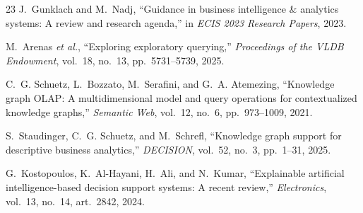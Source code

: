 \documentclass[journal]{IEEEtran}
\begin{document}
\begin{thebibliography}{23}
J.~Gunklach and M.~Nadj, ``Guidance in business intelligence \& analytics systems: A review and research agenda,'' in \emph{ECIS 2023 Research Papers}, 2023.

M.~Arenas \emph{et al.}, ``Exploring exploratory querying,'' \emph{Proceedings of the VLDB Endowment}, vol.~18, no.~13, pp.~5731--5739, 2025.

C.~G. Schuetz, L.~Bozzato, M.~Serafini, and G.~A. Atemezing, ``Knowledge graph OLAP: A multidimensional model and query operations for contextualized knowledge graphs,'' \emph{Semantic Web}, vol.~12, no.~6, pp.~973--1009, 2021.

S.~Staudinger, C.~G. Schuetz, and M.~Schrefl, ``Knowledge graph support for descriptive business analytics,'' \emph{DECISION}, vol.~52, no.~3, pp.~1--31, 2025.

G.~Kostopoulos, K.~Al-Hayani, H.~Ali, and N.~Kumar, ``Explainable artificial intelligence-based decision support systems: A recent review,'' \emph{Electronics}, vol.~13, no.~14, art.~2842, 2024.

\end{thebibliography}
\end{document}
